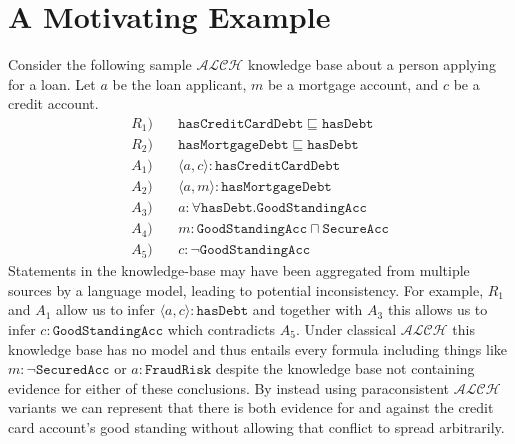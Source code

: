 \documentclass[letterpaper]{article} %
\theoremstyle{definition}
\theoremstyle{definition}
\theoremstyle{definition}
\theoremstyle{definition}
\theoremstyle{definition}
\begin{document}




\section{A Motivating Example}

Consider the following sample $\mathcal{ALCH}$ knowledge base about a person applying for a loan. Let $a$ be the loan applicant, $m$ be a mortgage account, and $c$ be a credit account.
\begin{align*}
R_1 ) \quad& \mathtt{hasCreditCardDebt} \sqsubseteq \mathtt{hasDebt}  \\
R_2) \quad& \mathtt{hasMortgageDebt} \sqsubseteq \mathtt{hasDebt} \\
A_1) \quad&\langle a,c \rangle : \mathtt{hasCreditCardDebt} \\
A_2) \quad&\langle a,m \rangle : \mathtt{hasMortgageDebt} \\
A_3) \quad&a:\forall \mathtt{hasDebt}.\mathtt{GoodStandingAcc} \\
A_4) \quad&m:\mathtt{GoodStandingAcc} \sqcap \mathtt{SecureAcc} \\
A_5) \quad&c : \lnot \mathtt{GoodStandingAcc}
\end{align*}
Statements in the knowledge-base may have been aggregated from multiple sources by a language model, leading to potential inconsistency. For example, $R_1$ and $A_1$ allow us to infer $\langle a,c\rangle : \mathtt{hasDebt} $ and together with $A_3$ this allows us to infer $c : \mathtt{GoodStandingAcc}$ which contradicts $A_5$. Under classical $\mathcal{ALCH}$ this knowledge base has no model and thus entails every formula including things like $m : \lnot \mathtt{SecuredAcc}$ or $a : \mathtt{FraudRisk}$ despite the knowledge base not containing evidence for either of these conclusions. By instead using paraconsistent $\mathcal{ALCH}$ variants we can represent that there is both evidence for and against the credit card account's good standing without allowing that conflict to spread arbitrarily.   
\end{document}
